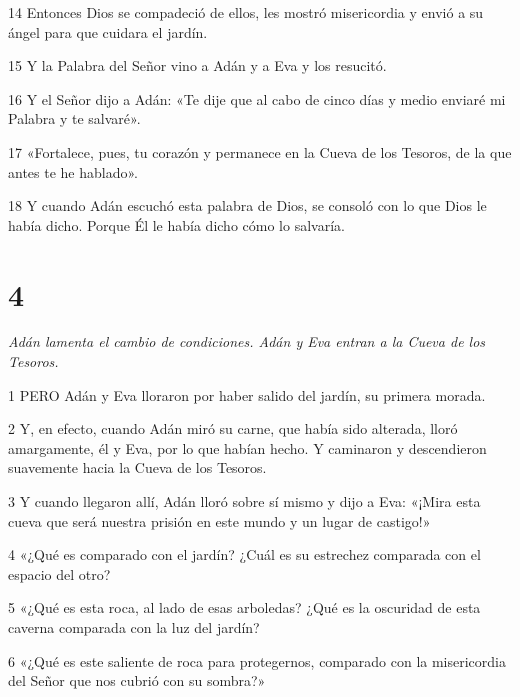 \par 14 Entonces Dios se compadeció de ellos, les mostró misericordia y envió a su ángel para que cuidara el jardín.

\par 15 Y la Palabra del Señor vino a Adán y a Eva y los resucitó.

\par 16 Y el Señor dijo a Adán: «Te dije que al cabo de cinco días y medio enviaré mi Palabra y te salvaré».

\par 17 «Fortalece, pues, tu corazón y permanece en la Cueva de los Tesoros, de la que antes te he hablado».

\par 18 Y cuando Adán escuchó esta palabra de Dios, se consoló con lo que Dios le había dicho. Porque Él le había dicho cómo lo salvaría.

\chapter{4}

\par \textit{Adán lamenta el cambio de condiciones. Adán y Eva entran a la Cueva de los Tesoros.}

\par 1 PERO Adán y Eva lloraron por haber salido del jardín, su primera morada.

\par 2 Y, en efecto, cuando Adán miró su carne, que había sido alterada, lloró amargamente, él y Eva, por lo que habían hecho. Y caminaron y descendieron suavemente hacia la Cueva de los Tesoros.

\par 3 Y cuando llegaron allí, Adán lloró sobre sí mismo y dijo a Eva: «¡Mira esta cueva que será nuestra prisión en este mundo y un lugar de castigo!»

\par 4 «¿Qué es comparado con el jardín? ¿Cuál es su estrechez comparada con el espacio del otro?

\par 5 «¿Qué es esta roca, al lado de esas arboledas? ¿Qué es la oscuridad de esta caverna comparada con la luz del jardín?

\par 6 «¿Qué es este saliente de roca para protegernos, comparado con la misericordia del Señor que nos cubrió con su sombra?»

